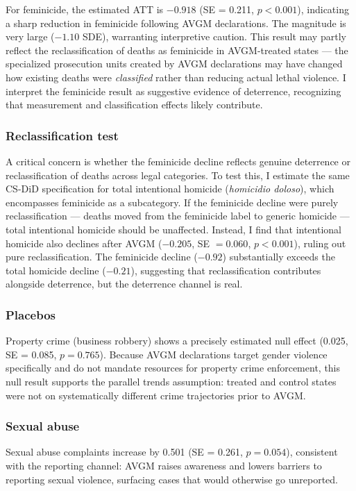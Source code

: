 \documentclass[12pt]{article}
\begin{document}
For feminicide, the estimated ATT is $-0.918$ (SE = 0.211, $p < 0.001$), indicating a sharp reduction in feminicide following AVGM declarations. The magnitude is very large ($-1.10$ SDE), warranting interpretive caution. This result may partly reflect the reclassification of deaths as feminicide in AVGM-treated states --- the specialized prosecution units created by AVGM declarations may have changed how existing deaths were \textit{classified} rather than reducing actual lethal violence. I interpret the feminicide result as suggestive evidence of deterrence, recognizing that measurement and classification effects likely contribute.

\subsubsection*{Reclassification test} A critical concern is whether the feminicide decline reflects genuine deterrence or reclassification of deaths across legal categories. To test this, I estimate the same CS-DiD specification for total intentional homicide (\textit{homicidio doloso}), which encompasses feminicide as a subcategory. If the feminicide decline were purely reclassification --- deaths moved from the feminicide label to generic homicide --- total intentional homicide should be unaffected. Instead, I find that intentional homicide also declines after AVGM ($-0.205$, SE $= 0.060$, $p < 0.001$), ruling out pure reclassification. The feminicide decline ($-0.92$) substantially exceeds the total homicide decline ($-0.21$), suggesting that reclassification contributes alongside deterrence, but the deterrence channel is real.

\subsubsection*{Placebos} Property crime (business robbery) shows a precisely estimated null effect (0.025, SE = 0.085, $p = 0.765$). Because AVGM declarations target gender violence specifically and do not mandate resources for property crime enforcement, this null result supports the parallel trends assumption: treated and control states were not on systematically different crime trajectories prior to AVGM.

\subsubsection*{Sexual abuse} Sexual abuse complaints increase by 0.501 (SE = 0.261, $p = 0.054$), consistent with the reporting channel: AVGM raises awareness and lowers barriers to reporting sexual violence, surfacing cases that would otherwise go unreported.
\end{document}
